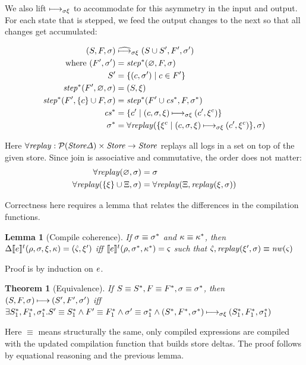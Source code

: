 \documentclass[preprint,onecolumn,9pt]{sigplanconf} %
\newtheorem{theorem}{Theorem}
\newtheorem{lemma}{Lemma}
\begin{document}
We also lift $\mathbin{\longmapsto_{\mathit{\sigma\xi}}}$ to accommodate for this asymmetry
in the input and output. For each state that is stepped, we feed the
output changes to the next so that all changes get accumulated:

\begin{align*}
(S, F, \sigma) &\mathrel{\mathbin{\widehat{\longmapsto}_{\mathit{\sigma\xi}}}} (S \cup S', F', \sigma') \\
\mbox{ where } (F', \sigma') &= \mathit{step}^*(\varnothing, F, \sigma) \\
               S' &= \{(c,\sigma') \mid c \in F'\} \\
\mathit{step}^*(F', \varnothing, \sigma) &= (S, \xi) \\
\mathit{step}^*(F', \{c\}\cup F, \sigma) &= \mathit{step}^*(F'\cup \mathit{cs}^*, F, \sigma^*) \\
\mathit{cs}^* &= \{c' \mid (c,\sigma,\xi) \mathbin{\longmapsto_{\mathit{\sigma\xi}}} (c',\xi^c) \} \\
\sigma^* &= \forall\mathit{replay}(\{\xi^c \mid (c, \sigma,\xi) \mathbin{\longmapsto_{\mathit{\sigma\xi}}} (c', \xi^c)\}, \sigma)
\end{align*}

Here $\forall\mathit{replay} : \mathcal{P}(\mathit{Store\Delta}) \times \mathit{Store} \to \mathit{Store}$ replays all logs in a set on top of the given store. Since join is associative and commutative, the order does not matter:
\begin{align*}
  \forall\mathit{replay}(\varnothing,\sigma) &= \sigma \\
  \forall\mathit{replay}(\{\xi\} \cup \Xi, \sigma) &= \forall\mathit{replay}(\Xi, \mathit{replay}(\xi, \sigma))
\end{align*}

Correctness here requires a lemma that relates the differences in the compilation functions.
\begin{lemma}[Compile coherence]
If $\sigma \equiv \sigma^*$ and $\kappa \equiv \kappa^*$, then
$\Delta\llbracket e\rrbracket^{t}(\rho,\sigma,\xi,\kappa) = (\hat{\varsigma}, \xi')$ iff
$\llbracket e\rrbracket^{t}(\rho,\sigma^*,\kappa^*) = \varsigma$ such that
$\hat{\varsigma},\mathit{replay}(\xi',\sigma) \equiv \mathit{nw}(\varsigma)$
\end{lemma}
Proof is by induction on $e$.

\begin{theorem}[Equivalence]
If $S \equiv S^*, F \equiv F^*, \sigma \equiv \sigma^*$, then
$(S,F,\sigma) \mathbin{\longmapsto} (S',F',\sigma')$ iff
$\exists S^*_1, F^*_1, \sigma^*_1.
  S' \equiv S^*_1 \wedge F' \equiv F^*_1 \wedge \sigma' \equiv \sigma^*_1 \wedge
  (S^*,F^*,\sigma^*) \mathbin{\longmapsto_{\mathit{\sigma\xi}}} (S^*_1,F^*_1,\sigma^*_1)$
\end{theorem}
Here $\equiv$ means structurally the same, only compiled expressions
are compiled with the updated compilation function that builds store
deltas. The proof follows by equational reasoning and the previous lemma.
\end{document}

